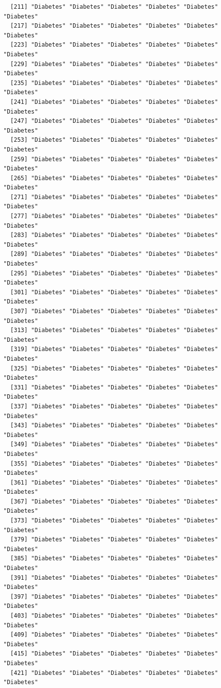\documentclass[
  letterpaper,
  DIV=11,
  numbers=noendperiod]{scrartcl}
\begin{document}
\begin{verbatim}
  [211] "Diabetes" "Diabetes" "Diabetes" "Diabetes" "Diabetes" "Diabetes"
  [217] "Diabetes" "Diabetes" "Diabetes" "Diabetes" "Diabetes" "Diabetes"
  [223] "Diabetes" "Diabetes" "Diabetes" "Diabetes" "Diabetes" "Diabetes"
  [229] "Diabetes" "Diabetes" "Diabetes" "Diabetes" "Diabetes" "Diabetes"
  [235] "Diabetes" "Diabetes" "Diabetes" "Diabetes" "Diabetes" "Diabetes"
  [241] "Diabetes" "Diabetes" "Diabetes" "Diabetes" "Diabetes" "Diabetes"
  [247] "Diabetes" "Diabetes" "Diabetes" "Diabetes" "Diabetes" "Diabetes"
  [253] "Diabetes" "Diabetes" "Diabetes" "Diabetes" "Diabetes" "Diabetes"
  [259] "Diabetes" "Diabetes" "Diabetes" "Diabetes" "Diabetes" "Diabetes"
  [265] "Diabetes" "Diabetes" "Diabetes" "Diabetes" "Diabetes" "Diabetes"
  [271] "Diabetes" "Diabetes" "Diabetes" "Diabetes" "Diabetes" "Diabetes"
  [277] "Diabetes" "Diabetes" "Diabetes" "Diabetes" "Diabetes" "Diabetes"
  [283] "Diabetes" "Diabetes" "Diabetes" "Diabetes" "Diabetes" "Diabetes"
  [289] "Diabetes" "Diabetes" "Diabetes" "Diabetes" "Diabetes" "Diabetes"
  [295] "Diabetes" "Diabetes" "Diabetes" "Diabetes" "Diabetes" "Diabetes"
  [301] "Diabetes" "Diabetes" "Diabetes" "Diabetes" "Diabetes" "Diabetes"
  [307] "Diabetes" "Diabetes" "Diabetes" "Diabetes" "Diabetes" "Diabetes"
  [313] "Diabetes" "Diabetes" "Diabetes" "Diabetes" "Diabetes" "Diabetes"
  [319] "Diabetes" "Diabetes" "Diabetes" "Diabetes" "Diabetes" "Diabetes"
  [325] "Diabetes" "Diabetes" "Diabetes" "Diabetes" "Diabetes" "Diabetes"
  [331] "Diabetes" "Diabetes" "Diabetes" "Diabetes" "Diabetes" "Diabetes"
  [337] "Diabetes" "Diabetes" "Diabetes" "Diabetes" "Diabetes" "Diabetes"
  [343] "Diabetes" "Diabetes" "Diabetes" "Diabetes" "Diabetes" "Diabetes"
  [349] "Diabetes" "Diabetes" "Diabetes" "Diabetes" "Diabetes" "Diabetes"
  [355] "Diabetes" "Diabetes" "Diabetes" "Diabetes" "Diabetes" "Diabetes"
  [361] "Diabetes" "Diabetes" "Diabetes" "Diabetes" "Diabetes" "Diabetes"
  [367] "Diabetes" "Diabetes" "Diabetes" "Diabetes" "Diabetes" "Diabetes"
  [373] "Diabetes" "Diabetes" "Diabetes" "Diabetes" "Diabetes" "Diabetes"
  [379] "Diabetes" "Diabetes" "Diabetes" "Diabetes" "Diabetes" "Diabetes"
  [385] "Diabetes" "Diabetes" "Diabetes" "Diabetes" "Diabetes" "Diabetes"
  [391] "Diabetes" "Diabetes" "Diabetes" "Diabetes" "Diabetes" "Diabetes"
  [397] "Diabetes" "Diabetes" "Diabetes" "Diabetes" "Diabetes" "Diabetes"
  [403] "Diabetes" "Diabetes" "Diabetes" "Diabetes" "Diabetes" "Diabetes"
  [409] "Diabetes" "Diabetes" "Diabetes" "Diabetes" "Diabetes" "Diabetes"
  [415] "Diabetes" "Diabetes" "Diabetes" "Diabetes" "Diabetes" "Diabetes"
  [421] "Diabetes" "Diabetes" "Diabetes" "Diabetes" "Diabetes" "Diabetes"

\end{verbatim}
\end{document}
